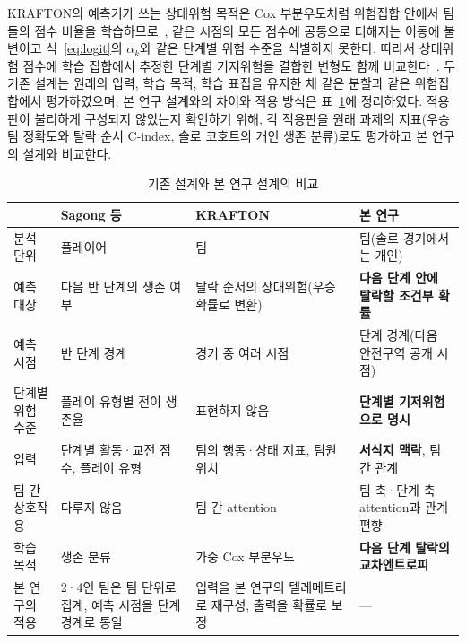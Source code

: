 KRAFTON의 예측기가 쓰는 상대위험 목적은 Cox 부분우도처럼 위험집합 안에서 팀들의 점수 비율을 학습하므로~\cite{Cox72}, 같은 시점의 모든 점수에 공통으로 더해지는 이동에 불변이고 식~\eqref{eq:logit}의 $\alpha_k$와 같은 단계별 위험 수준을 식별하지 못한다.
따라서 상대위험 점수에 학습 집합에서 추정한 단계별 기저위험을 결합한 변형도 함께 비교한다~\cite{PrenticeGloeckler78}.
두 기존 설계는 원래의 입력, 학습 목적, 학습 표집을 유지한 채 같은 분할과 같은 위험집합에서 평가하였으며, 본 연구 설계와의 차이와 적용 방식은 표~\ref{tab:compare}에 정리하였다.
적용판이 불리하게 구성되지 않았는지 확인하기 위해, 각 적용판을 원래 과제의 지표(우승 팀 정확도와 탈락 순서 C-index, 솔로 코호트의 개인 생존 분류)로도 평가하고 본 연구의 설계와 비교한다.

\begin{table}[t]
\centering
\caption{기존 설계와 본 연구 설계의 비교}
\label{tab:compare}
\footnotesize
\renewcommand{\arraystretch}{1.2}
\begin{tabular}{p{2.3cm}p{4.3cm}p{4.6cm}p{4.6cm}}
\hline
 & Sagong 등~\cite{Sagong25a} & KRAFTON~\cite{KRAFTON} & 본 연구 \\
\hline
분석 단위 & 플레이어 & 팀 & 팀(솔로 경기에서는 개인) \\
예측 대상 & 다음 반 단계의 생존 여부 & 탈락 순서의 상대위험(우승확률로 변환) & \textbf{다음 단계 안에 탈락할 조건부 확률} \\
예측 시점 & 반 단계 경계 & 경기 중 여러 시점 & 단계 경계(다음 안전구역 공개 시점) \\
단계별 위험 수준 & 플레이 유형별 전이 생존율 & 표현하지 않음 & \textbf{단계별 기저위험으로 명시} \\
입력 & 단계별 활동·교전 점수, 플레이 유형 & 팀의 행동·상태 지표, 팀원 위치 & \textbf{서식지 맥락}, 팀 간 관계 \\
팀 간 상호작용 & 다루지 않음 & 팀 간 attention & 팀 축·단계 축 attention과 관계 편향 \\
학습 목적 & 생존 분류 & 가중 Cox 부분우도 & \textbf{다음 단계 탈락의 교차엔트로피} \\
\hline
본 연구의 적용 & 2·4인 팀은 팀 단위로 집계, 예측 시점을 단계 경계로 통일 & 입력을 본 연구의 텔레메트리로 재구성, 출력을 확률로 보정~\cite{Platt99} & --- \\
\hline
\end{tabular}
\end{table}

